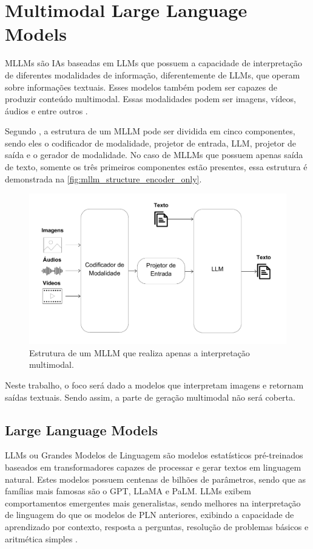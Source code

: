 \section{Multimodal Large Language Models}

\acp{MLLM} são \acp{IA} baseadas em \acp{LLM} que possuem a capacidade de interpretação de diferentes modalidades de informação, diferentemente de \acp{LLM}, que
operam sobre informações textuais. Esses modelos também podem ser capazes de produzir conteúdo multimodal. Essas modalidades podem ser imagens, vídeos, áudios e
entre outros \cite{mllm_survey_2023, mllm_survey_2024}.

Segundo \textcite{mllm_survey_2024}, a estrutura de um \ac{MLLM} pode ser dividida em cinco componentes, sendo eles o codificador de modalidade, projetor de entrada,
\ac{LLM}, projetor de saída e o gerador de modalidade. No caso de \acp{MLLM} que possuem apenas saída de texto, somente os três primeiros componentes estão presentes,
essa estrutura é demonstrada na \autoref{fig:mllm_structure_encoder_only}.

\begin{figure}[ht]
      \centering
      \includegraphics[width=0.7\columnwidth,keepaspectratio]{images/mllm_structure_encoder_only.pdf}
      \caption{\small Estrutura de um \ac{MLLM} que realiza apenas a interpretação multimodal.}
      \label{fig:mllm_structure_encoder_only}
\end{figure}

Neste trabalho, o foco será dado a modelos que interpretam imagens e retornam saídas textuais. Sendo assim, a parte de geração multimodal não será coberta.

\subsection{Large Language Models}

\acp{LLM} ou Grandes Modelos de Linguagem são modelos estatísticos pré-treinados baseados em transformadores capazes de processar e gerar textos em linguagem natural.
Estes modelos possuem centenas de bilhões de parâmetros, sendo que as famílias mais famosas são o \ac{GPT}, \ac{LLaMA} e \ac{PaLM}. \acp{LLM} exibem comportamentos
emergentes mais generalistas, sendo melhores na interpretação de linguagem do que os modelos de \ac{PLN} anteriores, exibindo a capacidade de aprendizado por contexto,
resposta a perguntas, resolução de problemas básicos e aritmética simples \cite{llm}.


